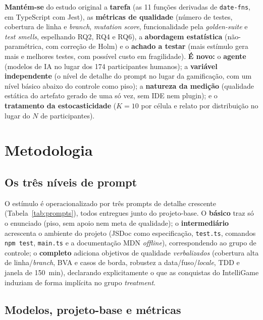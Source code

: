 \documentclass[12pt]{article}
\begin{document}
\textbf{Mantém-se} do estudo original a \textbf{tarefa} (as 11 funções derivadas
de \texttt{date-fns}, em TypeScript com Jest), as \textbf{métricas de qualidade}
(número de testes, cobertura de linha e \emph{branch}, \emph{mutation score},
funcionalidade pela \emph{golden-suite} e \emph{test smells}, espelhando RQ2, RQ4
e RQ6), a \textbf{abordagem estatística} (não-paramétrica, com correção de Holm) e
o \textbf{achado a testar} (mais estímulo gera mais e melhores testes, com
possível custo em fragilidade). \textbf{É novo:} o \textbf{agente} (modelos de IA
no lugar dos 174 participantes humanos); a \textbf{variável independente} (o nível
de detalhe do prompt no lugar da gamificação, com um nível básico abaixo do
controle como piso); a \textbf{natureza da medição} (qualidade estática do
artefato gerado de uma só vez, sem IDE nem plugin); e o \textbf{tratamento da
estocasticidade} ($K=10$ por célula e relato por distribuição no lugar do $N$ de
participantes).

\section{Metodologia}

\subsection{Os três níveis de prompt}

O estímulo é operacionalizado por três prompts de detalhe crescente
(Tabela~\ref{tab:prompts}), todos entregues junto do projeto-base. O
\textbf{básico} traz só o enunciado (piso, sem apoio nem meta de qualidade); o
\textbf{intermediário} acrescenta o ambiente do projeto (JSDoc como
especificação, \texttt{test.ts}, comandos \texttt{npm test}, \texttt{main.ts} e a
documentação MDN \emph{offline}), correspondendo ao grupo de controle; o
\textbf{completo} adiciona objetivos de qualidade \emph{verbalizados} (cobertura
alta de linha/\emph{branch}, BVA e casos de borda, robustez a data/fuso/\emph{locale},
TDD e janela de 150~min), declarando explicitamente o que as conquistas do
IntelliGame induziam de forma implícita no grupo \emph{treatment}.

\subsection{Modelos, projeto-base e métricas}
\end{document}
